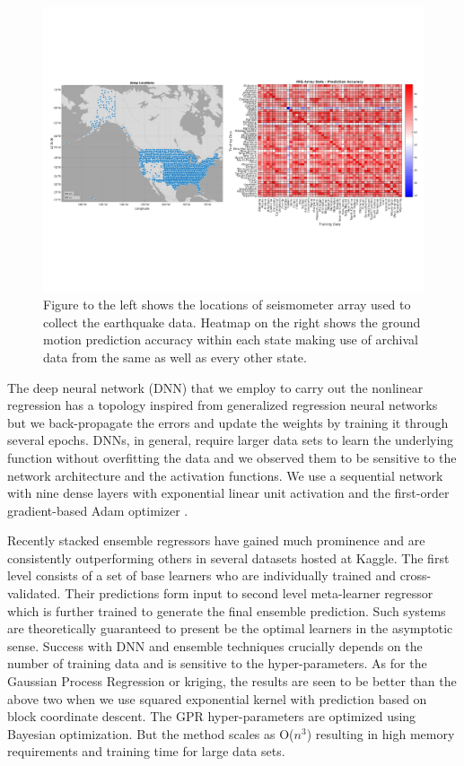 \documentclass[reprint, prl, aps, showpacs]{revtex4-1}
\begin{document}
\begin{figure}[!htb]
 \includegraphics[width=\textwidth]{./plots/USArray_with_HeatMap}
 \caption{Figure to the left shows the locations of seismometer array used to collect the earthquake data. Heatmap on the right shows the ground motion prediction accuracy within each state making use of archival data from the same as well as every other state.}
 \label{fig:map}
\end{figure}


The deep neural network (DNN) that we employ to carry out the nonlinear regression has a topology inspired from generalized regression neural networks\cite{specht1991general} but we back-propagate the errors and update the weights by training it through several epochs.   DNNs, in general, require larger data sets to learn the underlying function without overfitting the data and we observed them to be sensitive to the network architecture and the activation functions. We use a sequential network with nine dense layers with exponential linear unit activation and the first-order gradient-based Adam optimizer \cite{kingma2014adam}.

Recently stacked ensemble regressors have gained much prominence and are consistently outperforming others in several datasets hosted at Kaggle\cite{Kaggle}. The first level consists of a set of base learners who are individually trained and cross-validated. Their predictions form input to second level meta-learner regressor which is further trained to generate the final ensemble prediction.  Such systems are theoretically guaranteed to present be the optimal learners in the asymptotic sense. Success with DNN and ensemble techniques crucially depends on the number of training data and is sensitive to the hyper-parameters. As for the Gaussian Process Regression or kriging, the results are seen to be better than the above two when we use squared exponential kernel with prediction based on block coordinate descent. The GPR hyper-parameters are optimized using Bayesian optimization. But the method scales as O($n^3$) resulting in high memory requirements and training time for large data sets.
\end{document}
